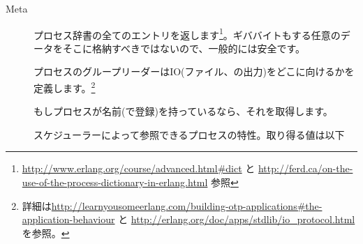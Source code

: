 \begin{description*}
	\item[Meta] \hfill
		\begin{description}		
      \item[] プロセス辞書の全てのエントリを返します\footnote{\href{http://www.erlang.org/course/advanced.html\#dict}{http://www.erlang.org/course/advanced.html\#dict} と \href{http://ferd.ca/on-the-use-of-the-process-dictionary-in-erlang.html}{http://ferd.ca/on-the-use-of-the-process-dictionary-in-erlang.html} 参照}。ギババイトもする任意のデータをそこに格納すべきではないので、一般的には安全です。

			\item[] プロセスのグループリーダーはIO(ファイル、の出力)をどこに向けるかを定義します。\footnote{詳細は\href{http://learnyousomeerlang.com/building-otp-applications\#the-application-behaviour}{http://learnyousomeerlang.com/building-otp-applications\#the-application-behaviour} と \href{http://erlang.org/doc/apps/stdlib/io\_protocol.html}{http://erlang.org/doc/apps/stdlib/io\_protocol.html} を参照。}

			\item[] もしプロセスが名前(で登録)を持っているなら、それを取得します。

			\item[] スケジューラーによって参照できるプロセスの特性。取り得る値は以下


\end{description}
\end{description*}
